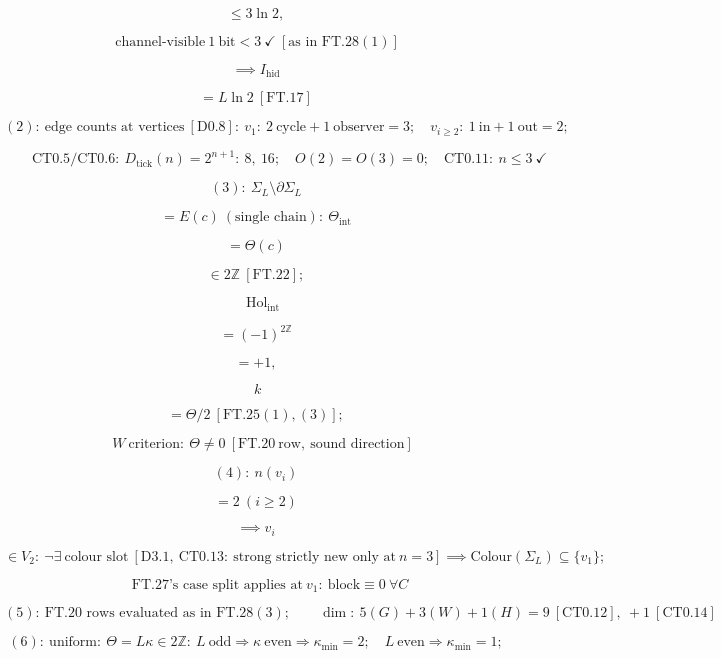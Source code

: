 \begin{theorem}
\[
\le 3\ln2,
\]

\[
\ \text{channel-visible}\ 1\ \text{bit}<3\ \checkmark\ [\text{as in FT.28}(1)]
\]

\[
\implies I_{\mathrm{hid}}
\]

\[
= L\ln2\ [\mathrm{FT.17}]
\]

\[
(2):\ \text{edge counts at vertices}\ [\mathrm{D0.8}]:\ v_1:\ 2\ \text{cycle}+1\ \text{observer}=3;\quad v_{i\ge2}:\ 1\ \text{in}+1\ \text{out}=2;
\]

\[
\qquad \mathrm{CT0.5}/\mathrm{CT0.6}:\ D_{\mathrm{tick}}(n)=2^{n+1}:\ 8,\ 16;\quad O(2)=O(3)=0;\quad\mathrm{CT0.11}:\ n\le3\ \checkmark
\]

\[
(3):\ \Sigma_L\setminus\partial\Sigma_L
\]

\[
= E(c)\ (\text{single chain}):\ \Theta_{\mathrm{int}}
\]

\[
= \Theta(c)
\]

\[
\in 2\mathbb Z\ [\mathrm{FT.22}];
\]

\[
\quad\mathrm{Hol}_{\mathrm{int}}
\]

\[
= (-1)^{2\mathbb Z}
\]

\[
= +1,
\]

\[
\ k
\]

\[
= \Theta/2\ [\mathrm{FT.25}(1),(3)];
\]

\[
\quad W\ \text{criterion}:\ \Theta\ne0\ [\mathrm{FT.20}\ \text{row},\ \text{sound direction}]
\]

\[
(4):\ n(v_i)
\]

\[
= 2\ (i\ge2)
\]

\[
\implies v_i
\]

\[
\in V_2:\ \neg\exists\ \text{colour slot}\ [\mathrm{D3.1},\ \mathrm{CT0.13}:\ \text{strong strictly new only at}\ n{=}3]\implies\mathrm{Colour}(\Sigma_L)\subseteq\{v_1\};
\]

\[
\qquad \text{FT.27's case split applies at}\ v_1:\ \text{block}\equiv0\ \forall C
\]

\[
(5):\ \text{FT.20 rows evaluated as in FT.28}(3);\qquad\dim:\ 5(G)+3(W)+1(H)=9\ [\mathrm{CT0.12}],\ +1\ [\mathrm{CT0.14}]
\]

\[
(6):\ \text{uniform}:\ \Theta=L\kappa\in2\mathbb Z:\ L\ \text{odd}\Rightarrow\kappa\ \text{even}\Rightarrow\kappa_{\min}=2;\quad L\ \text{even}\Rightarrow\kappa_{\min}=1;
\]


\end{theorem}
